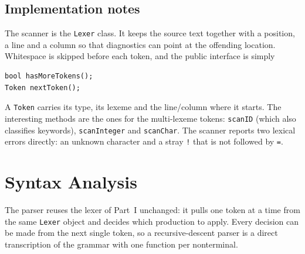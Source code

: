 \documentclass[11pt]{article}
\begin{document}
\subsection{Implementation notes}
The scanner is the \texttt{Lexer} class. It keeps the source text together
with a position, a line and a column so that diagnostics can point at the
offending location. Whitespace is skipped before each token, and the public
interface is simply

\begin{lstlisting}
bool hasMoreTokens();
Token nextToken();
\end{lstlisting}

A \texttt{Token} carries its type, its lexeme and the line/column where it
starts. The interesting methods are the ones for the multi-lexeme tokens:
\texttt{scanID} (which also classifies keywords), \texttt{scanInteger} and
\texttt{scanChar}. The scanner reports two lexical errors directly: an
unknown character and a stray \texttt{!} that is not followed by \texttt{=}.

\section{Syntax Analysis}
The parser reuses the lexer of Part~I unchanged: it pulls one token at a
time from the same \texttt{Lexer} object and decides which production to
apply. Every decision can be made from the next single token, so a
recursive-descent parser is a direct transcription of the grammar with one
function per nonterminal.
\end{document}
